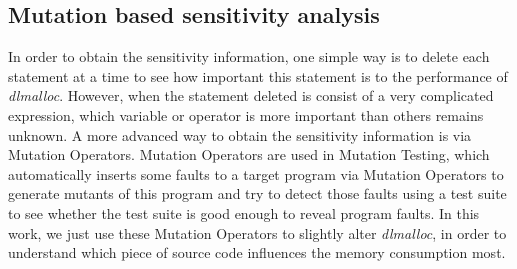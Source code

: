 \subsection{Mutation based sensitivity analysis}

In order to obtain the sensitivity information, one simple way is to delete each statement at a time to see how important this statement is to the performance of \emph{dlmalloc}. However, when the statement deleted is consist of a very complicated expression, which variable or operator is more important than others remains unknown. A more advanced way to obtain the sensitivity information is via Mutation Operators. Mutation Operators are used in Mutation Testing, which automatically inserts some faults to a target program via Mutation Operators to generate mutants of this program and try to detect those faults using a test suite to see whether the test suite is good enough to reveal program faults. In this work, we just use these Mutation Operators to slightly alter \emph{dlmalloc}, in order to understand which piece of source code influences the memory consumption most.


